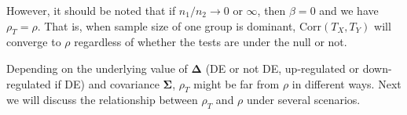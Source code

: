 \documentclass[12pt, a4paper]{article}
\newtheorem{corollary}{corollary}
\newcommand{\cor}{\text{Corr}}
\begin{document}
	However, it should be noted that if $n_1/n_2 \rightarrow 0$ or $\infty$, then $\beta = 0$ and we have $\rho_T = \rho$. That is, when sample size of one group is dominant, $\cor(T_X, T_Y)$ will converge to $\rho$ regardless of whether the tests are under the null or not. 
	

	
	
	Depending on the underlying value of $\bm\Delta$ (DE or not DE, up-regulated or down-regulated if DE) and covariance $\bm \Sigma$,
	$\rho_T$ might be far from $\rho$ in different ways. Next we will discuss the relationship between $\rho_T$ and $\rho$ under several scenarios.
	
\end{document}
